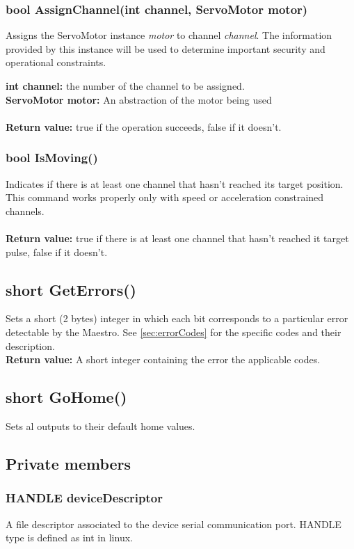 \documentclass[letterpaper]{book}
\begin{document}
\subsubsection{bool AssignChannel(int channel, ServoMotor motor)}
Assigns the ServoMotor instance \textit{motor} to channel \textit{channel}. The information provided by this instance will be used to determine important security and operational constraints.

\textbf{int channel: }the number of the channel to be assigned.\\
\textbf{ServoMotor motor: } An abstraction of the motor being used\\\\
\textbf{Return value: } true if the operation succeeds, false if it doesn't.

\subsubsection{bool IsMoving()}
Indicates if there is at least one channel that hasn't reached its target position. This command works properly only with speed or acceleration constrained channels. \\\\
\textbf{Return value: } true if there is at least one channel that hasn't reached it target pulse, false if  it doesn't.

\subsection{short GetErrors()}
Sets a short (2 bytes) integer in which each bit corresponds to a particular error detectable by the Maestro. See \ref{sec:errorCodes} for the specific codes and their description.\\
\textbf{Return value: } A short integer containing the error the applicable codes.


\subsection{short GoHome()}
Sets al outputs to their default home values.
\subsection{Private members}

\subsubsection{HANDLE deviceDescriptor}
A file descriptor associated to the device serial communication port. HANDLE type is defined as int in linux.
\end{document}
